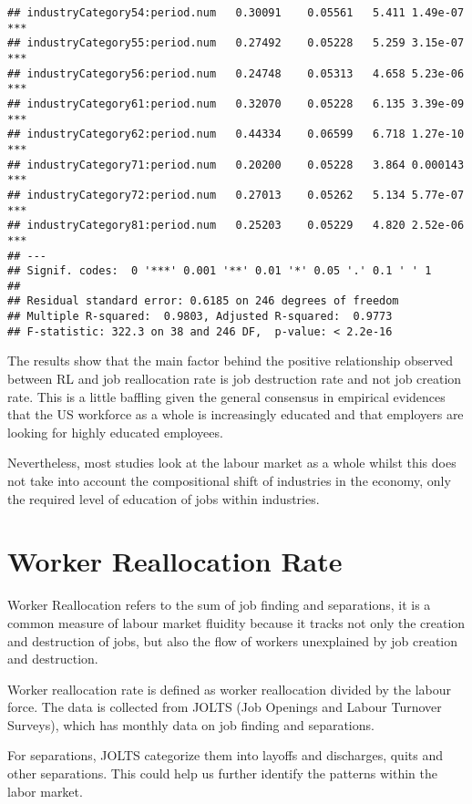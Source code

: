 \documentclass[
]{article}
\begin{document}
\begin{verbatim}
## industryCategory54:period.num   0.30091    0.05561   5.411 1.49e-07 ***
## industryCategory55:period.num   0.27492    0.05228   5.259 3.15e-07 ***
## industryCategory56:period.num   0.24748    0.05313   4.658 5.23e-06 ***
## industryCategory61:period.num   0.32070    0.05228   6.135 3.39e-09 ***
## industryCategory62:period.num   0.44334    0.06599   6.718 1.27e-10 ***
## industryCategory71:period.num   0.20200    0.05228   3.864 0.000143 ***
## industryCategory72:period.num   0.27013    0.05262   5.134 5.77e-07 ***
## industryCategory81:period.num   0.25203    0.05229   4.820 2.52e-06 ***
## ---
## Signif. codes:  0 '***' 0.001 '**' 0.01 '*' 0.05 '.' 0.1 ' ' 1
## 
## Residual standard error: 0.6185 on 246 degrees of freedom
## Multiple R-squared:  0.9803, Adjusted R-squared:  0.9773 
## F-statistic: 322.3 on 38 and 246 DF,  p-value: < 2.2e-16
\end{verbatim}

The results show that the main factor behind the positive relationship
observed between RL and job reallocation rate is job destruction rate
and not job creation rate. This is a little baffling given the general
consensus in empirical evidences that the US workforce as a whole is
increasingly educated and that employers are looking for highly educated
employees.

Nevertheless, most studies look at the labour market as a whole whilst
this does not take into account the compositional shift of industries in
the economy, only the required level of education of jobs within
industries.

\hypertarget{worker-reallocation-rate}{%
\section{Worker Reallocation Rate}\label{worker-reallocation-rate}}

Worker Reallocation refers to the sum of job finding and separations, it
is a common measure of labour market fluidity because it tracks not only
the creation and destruction of jobs, but also the flow of workers
unexplained by job creation and destruction.

Worker reallocation rate is defined as worker reallocation divided by
the labour force. The data is collected from JOLTS (Job Openings and
Labour Turnover Surveys), which has monthly data on job finding and
separations.

For separations, JOLTS categorize them into layoffs and discharges,
quits and other separations. This could help us further identify the
patterns within the labor market.
\end{document}
